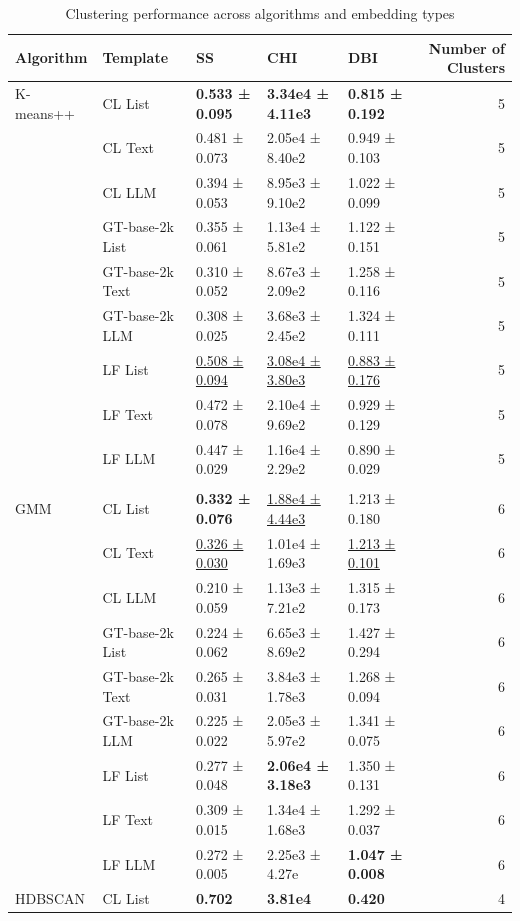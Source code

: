 \begin{table}[!h]
\centering
\caption{Clustering performance across algorithms and embedding types}
\centering
\begin{tabular}[t]{lllllr}
\toprule
Algorithm & Template & SS & CHI & DBI & Number of Clusters\\
\midrule
K-means++ & CL List & \textbf{0.533 ± 0.095} & \textbf{3.34e4 ± 4.11e3} & \textbf{0.815 ± 0.192} & 5\\
 & CL Text & 0.481 ± 0.073 & 2.05e4 ± 8.40e2 & 0.949 ± 0.103 & 5\\
 & CL LLM & 0.394 ± 0.053 & 8.95e3 ± 9.10e2 & 1.022 ± 0.099 & 5\\
 & GT-base-2k List & 0.355 ± 0.061 & 1.13e4 ± 5.81e2 & 1.122 ± 0.151 & 5\\
 & GT-base-2k Text & 0.310 ± 0.052 & 8.67e3 ± 2.09e2 & 1.258 ± 0.116 & 5\\
\addlinespace
 & GT-base-2k LLM & 0.308 ± 0.025 & 3.68e3 ± 2.45e2 & 1.324 ± 0.111 & 5\\
 & LF List & \underline{0.508 ± 0.094} & \underline{3.08e4 ± 3.80e3} & \underline{0.883 ± 0.176} & 5\\
 & LF Text & 0.472 ± 0.078 & 2.10e4 ± 9.69e2 & 0.929 ± 0.129 & 5\\
 & LF LLM & 0.447 ± 0.029 & 1.16e4 ± 2.29e2 & 0.890 ± 0.029 & 5\\
\midrule\\
GMM & CL List & \textbf{0.332 ± 0.076} & \underline{1.88e4 ± 4.44e3} & 1.213 ± 0.180 & 6\\
\addlinespace
 & CL Text & \underline{0.326 ± 0.030} & 1.01e4 ± 1.69e3 & \underline{1.213 ± 0.101} & 6\\
 & CL LLM & 0.210 ± 0.059 & 1.13e3 ± 7.21e2 & 1.315 ± 0.173 & 6\\
 & GT-base-2k List & 0.224 ± 0.062 & 6.65e3 ± 8.69e2 & 1.427 ± 0.294 & 6\\
 & GT-base-2k Text & 0.265 ± 0.031 & 3.84e3 ± 1.78e3 & 1.268 ± 0.094 & 6\\
 & GT-base-2k LLM & 0.225 ± 0.022 & 2.05e3 ± 5.97e2 & 1.341 ± 0.075 & 6\\
\addlinespace
 & LF List & 0.277 ± 0.048 & \textbf{2.06e4 ± 3.18e3} & 1.350 ± 0.131 & 6\\
 & LF Text & 0.309 ± 0.015 & 1.34e4 ± 1.68e3 & 1.292 ± 0.037 & 6\\
 & LF LLM & 0.272 ± 0.005 & 2.25e3 ± 4.27e & \textbf{1.047 ± 0.008} & 6\\
\midrule
HDBSCAN & CL List & \textbf{0.702} & \textbf{3.81e4} & \textbf{0.420} & 4\\

\end{tabular}
\end{table}
